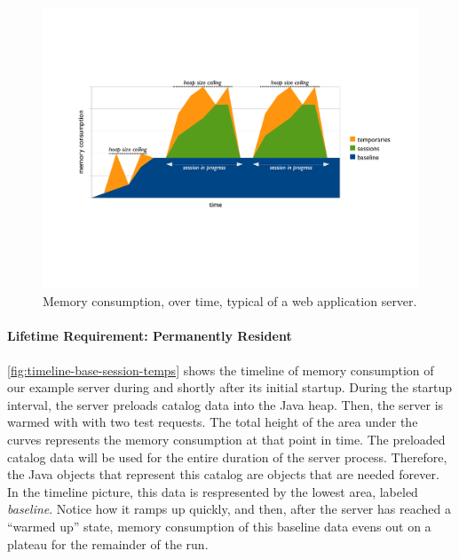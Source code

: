 \begin{figure}
	\centering
	\includegraphics[width=\textwidth]{part4/Figures/lifetime/timeline-base-session-temps}
	\caption{Memory consumption, over time, typical of a web application server.}
	\label{fig:timeline-base-session-temps}
\end{figure}

\paragraph{Lifetime Requirement: Permanently Resident}
\autoref{fig:timeline-base-session-temps} shows the timeline of memory
consumption of our example server 
during and shortly after its initial startup.
During the startup interval, the server preloads catalog data into
the Java heap. Then, the server is warmed with with two test requests.
The total height of the area
under the curves represents the memory consumption at that point in time. 
The preloaded catalog
data will be used for the entire duration of the server process.
Therefore, the Java objects that represent this catalog are objects that are
needed forever. In the timeline picture, this data is respresented by the lowest area, labeled
\emph{baseline}. Notice how it ramps up quickly, and then, after the server has
reached a ``warmed up'' state, memory consumption of this baseline data evens out
on a plateau for the remainder of the run.

